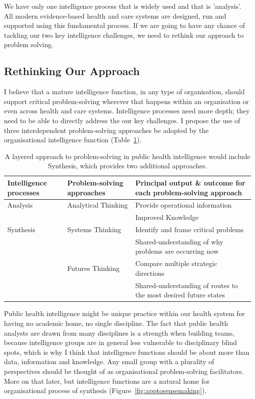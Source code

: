 We have only one intelligence process that is widely used and that is 'analysis'. All modern evidence-based health and care systems are designed, run and supported using this fundamental process. If we are going to have any chance of tackling our two key intelligence challenges, we need to rethink our approach to problem solving.


\subsection{Rethinking Our Approach}

I believe that a mature intelligence function, in any type of organisation, should support critical problem-solving wherever that happens within an organisation or even across health and care systems. Intelligence processes need more depth; they need to be able to directly address the our key challenges. I propose the use of three interdependent problem-solving approaches be adopted by the organisational intelligence function (Table~\ref{tab:response}).

\begin{table}[h]
	\begin{center}
		\footnotesize%
		\begin{tabular}{p{1.75cm} p{2.75cm} p{4.75cm}}
			\toprule
			Intelligence processes & Problem-solving approaches & Principal output \& outcome for each problem-solving approach \\
			\midrule
			Analysis    & Analytical Thinking & Provide operational information\\
			& & Improved Knowledge \\
			Synthesis & Systems Thinking & Identify and frame critical problems \\
			& & Shared-understanding of why problems are occurring now \\
			& Futures Thinking & Compare multiple strategic directions \\
			& & Shared-understanding of routes to the most desired future states \\
			\bottomrule
		\end{tabular}
	\end{center}
	\caption{A layered approach to problem-solving in public health intelligence would include Synthesis, which provides two additional approaches.}
	\label{tab:response}
\end{table}

Public health intelligence might be unique practice within our health system for having no academic home, no single discipline. The fact that public health analysts are drawn from many disciplines is a strength when building teams, because intelligence groups are in general less vulnerable to disciplinary blind spots, which is why I think that intelligence functions should be about more than data, information and knowledge. Any small group with a plurality of perspectives should be thought of as organisational problem-solving facilitators. More on that later, but intelligence functions are a natural home for organisational process of synthesis (Figure~\ref{fig:apptosensemaking}).


